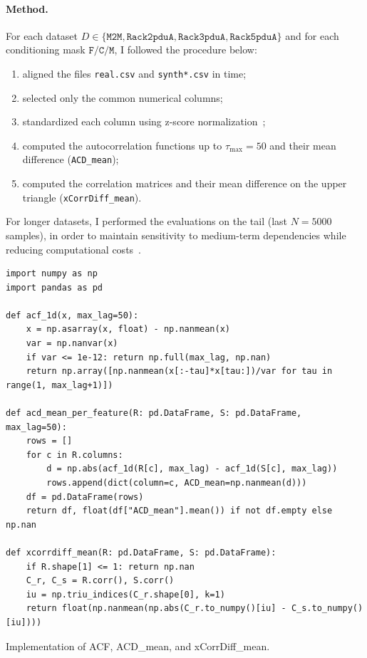 \paragraph{Method.}
For each dataset $D \in \{\texttt{M2M}, \texttt{Rack2pduA}, \texttt{Rack3pduA}, \texttt{Rack5pduA}\}$ and for each conditioning mask $\texttt{F}/\texttt{C}/\texttt{M}$, I followed the procedure below:
\begin{enumerate}
  \item aligned the files \texttt{real.csv} and \texttt{synth*.csv} in time;
  \item selected only the common numerical columns;
  \item standardized each column using z-score normalization~\cite{bishop2006pattern,hastie2009elements};
  \item computed the autocorrelation functions up to $\tau_{\max}{=}50$ and their mean difference (\texttt{ACD\_mean});
  \item computed the correlation matrices and their mean difference on the upper triangle (\texttt{xCorrDiff\_mean}).
\end{enumerate}
For longer datasets, I performed the evaluations on the tail (last $N{=}5000$ samples), in order to maintain sensitivity to medium-term dependencies while reducing computational costs~\cite{hyndman2018forecasting}.

\begin{listing}[H]
\begin{verbatim}
import numpy as np
import pandas as pd

def acf_1d(x, max_lag=50):
    x = np.asarray(x, float) - np.nanmean(x)
    var = np.nanvar(x)
    if var <= 1e-12: return np.full(max_lag, np.nan)
    return np.array([np.nanmean(x[:-tau]*x[tau:])/var for tau in range(1, max_lag+1)])

def acd_mean_per_feature(R: pd.DataFrame, S: pd.DataFrame, max_lag=50):
    rows = []
    for c in R.columns:
        d = np.abs(acf_1d(R[c], max_lag) - acf_1d(S[c], max_lag))
        rows.append(dict(column=c, ACD_mean=np.nanmean(d)))
    df = pd.DataFrame(rows)
    return df, float(df["ACD_mean"].mean()) if not df.empty else np.nan

def xcorrdiff_mean(R: pd.DataFrame, S: pd.DataFrame):
    if R.shape[1] <= 1: return np.nan
    C_r, C_s = R.corr(), S.corr()
    iu = np.triu_indices(C_r.shape[0], k=1)
    return float(np.nanmean(np.abs(C_r.to_numpy()[iu] - C_s.to_numpy()[iu])))
\end{verbatim}
\caption{Implementation of ACF, ACD\_mean, and xCorrDiff\_mean.}
\end{listing}

